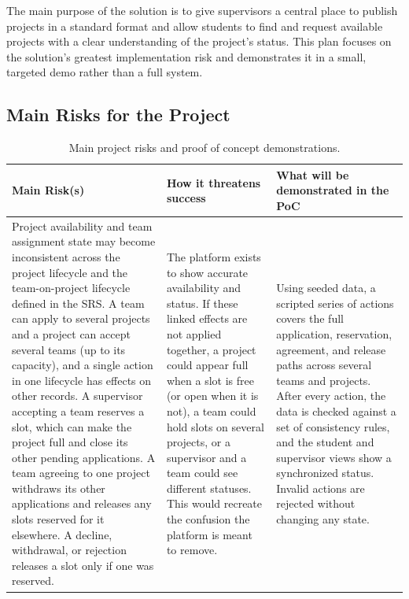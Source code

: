 \documentclass{article}
\begin{document}
The main purpose of the solution is to give supervisors a central place to
publish projects in a standard format and allow students to find and request
available projects with a clear understanding of the project's status. This
plan focuses on the solution's greatest implementation risk and demonstrates it
in a small, targeted demo rather than a full system.

\subsection{Main Risks for the Project}
\begin{table}[H]
    \centering
    \begin{tabular}{|p{}|p{}|p{}|}
        \hline
        \textbf{Main Risk(s)}                            & \textbf{How it threatens success}               & \textbf{What will be demonstrated in the PoC} \\ \hline
        Project availability and team assignment state may become inconsistent
        across the project lifecycle and the team-on-project lifecycle defined
        in the SRS. A team can apply to several projects and a project can
        accept several teams (up to its capacity), and a single action in one
        lifecycle has effects on other records. A supervisor accepting a team
        reserves a slot, which can make the project full and close its other
        pending applications. A team agreeing to one project withdraws its other
        applications and releases any slots reserved for it elsewhere. A
        decline, withdrawal, or rejection releases a slot only if one was
        reserved. & The platform exists to show accurate availability and
        status. If these linked effects are not applied together, a project
        could appear full when a slot is free (or open when it is not), a team
        could hold slots on several projects, or a supervisor and a team could
        see different statuses. This would recreate the confusion the platform
        is meant to remove. & Using seeded data, a scripted series of actions
        covers the full application, reservation, agreement, and release paths
        across several teams and projects. After every action, the data is
        checked against a set of consistency rules, and the student and
        supervisor views show a synchronized status. Invalid actions are
        rejected without changing any state. \\ \hline
    \end{tabular}
    \caption{Main project risks and proof of concept demonstrations.}
    \label{tab:poc-plan}
\end{table}
\end{document}
